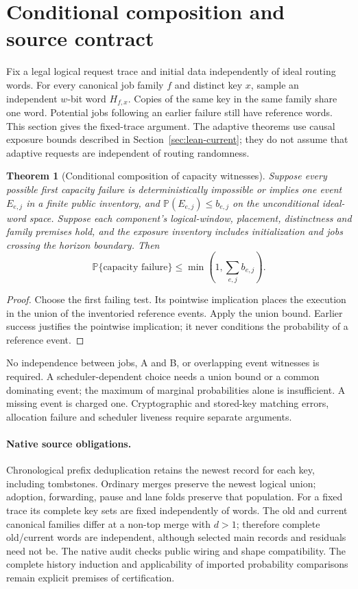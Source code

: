 \documentclass[11pt]{article}
\newtheorem{theorem}{Theorem}[section]
\theoremstyle{definition}
\theoremstyle{remark}
\newcommand{\Prb}{\mathbb P}
\begin{document}
\section{Conditional composition and source contract}
\label{sec:abstract-contract}
Fix a legal logical request trace and initial data independently of ideal
routing words. For every canonical job family $f$ and distinct key $x$,
sample an independent $w$-bit word $H_{f,x}$. Copies of the same key in the
same family share one word. Potential jobs following an earlier failure
still have reference words. This section gives the fixed-trace argument.
The adaptive theorems use causal exposure bounds described in
Section~\ref{sec:lean-current}; they do not assume that adaptive requests
are independent of routing randomness.

\begin{theorem}[Conditional composition of capacity witnesses]
\label{thm:abstract-composition}
Suppose every possible first capacity failure is deterministically impossible
or implies one event $E_{e,j}$ in a finite public inventory, and
$\Prb(E_{e,j})\le b_{e,j}$ on the unconditional ideal-word space.
Suppose each component's logical-window, placement, distinctness and family
premises hold, and the exposure inventory includes initialization and jobs
crossing the horizon boundary. Then
\[
 \Prb\{\text{capacity failure}\}\le
 \min\left(1,\sum_{e,j}b_{e,j}\right).
\]
\end{theorem}
\begin{proof}
Choose the first failing test. Its pointwise implication places the
execution in the union of the inventoried reference events. Apply the union
bound. Earlier success justifies the pointwise implication; it never
conditions the probability of a reference event.
\end{proof}
No independence between jobs, A and B, or overlapping event witnesses is
required. A scheduler-dependent choice needs a union bound or a common
dominating event; the maximum of marginal probabilities alone is insufficient.
A missing event is charged one. Cryptographic and stored-key matching errors,
allocation failure and scheduler liveness require separate arguments.

\paragraph{Native source obligations.}
\label{sec:native-sources}\label{prop:native-sources}
Chronological prefix deduplication retains the newest record for each key,
including tombstones. Ordinary merges preserve the newest logical union;
adoption, forwarding, pause and lane folds preserve that population.
For a fixed trace its complete key sets are fixed independently of words.
The old and current canonical families differ at a non-top merge with $d>1$;
therefore complete old/current words are independent, although selected main
records and residuals need not be. The native audit checks public wiring and
shape compatibility. The complete history induction and applicability of
imported probability comparisons remain explicit premises of certification.
\end{document}
